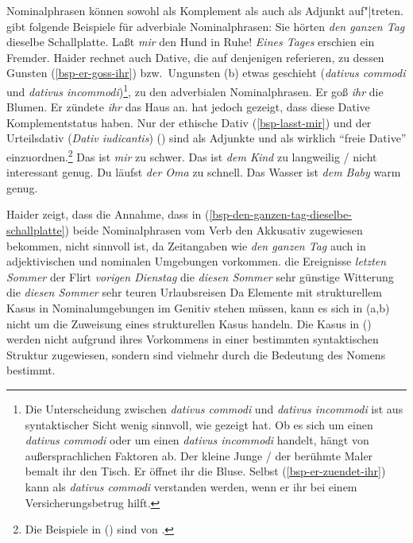 Nominalphrasen können sowohl als Komplement als auch als Adjunkt
auf"|treten. \citet*{Haider85b} gibt folgende 
Beispiele für adverbiale Nominalphrasen:
\eal
\ex Sie hörten \emph{den ganzen Tag} dieselbe Schallplatte.\label{bsp-den-ganzen-tag-dieselbe-schallplatte}
\ex Laßt \emph{mir} den Hund in Ruhe!\label{bsp-lasst-mir}
\ex \emph{Eines Tages} erschien ein Fremder.
\zl
Haider rechnet auch Dative, die auf denjenigen referieren, zu dessen Gunsten (\ref{bsp-er-goss-ihr})
bzw.\ Ungunsten (b) etwas geschieht (\emph{dativus commodi} und \emph{dativus incommodi})\footnote{\label{fn-dativ-commodi}%
        Die Unterscheidung zwischen \emph{dativus commodi} und \emph{dativus incommodi}
        ist aus syntaktischer Sicht wenig sinnvoll, wie \citet*[]{Wegener85b}
        gezeigt hat.
        Ob es sich um einen \emph{dativus commodi} oder um einen \emph{dativus incommodi} handelt,
        hängt von außersprachlichen Faktoren ab.
        \eal
        \ex Der kleine Junge / der berühmte Maler bemalt ihr den Tisch.
        \ex Er öffnet ihr die Bluse.
        \zl
        Selbst (\ref{bsp-er-zuendet-ihr}) kann als \emph{dativus commodi} verstanden werden, wenn
        er ihr bei einem Versicherungsbetrug hilft.%
}, zu den adverbialen Nominalphrasen.
\eal
\ex Er goß \emph{ihr} die Blumen.\label{bsp-er-goss-ihr}
\ex Er zündete \emph{ihr} das Haus an.\label{bsp-er-zuendet-ihr}
\zl
\citet*{Wegener85b} hat jedoch gezeigt, dass diese Dative Komplementstatus haben.
Nur der ethische Dativ (\ref{bsp-lasst-mir}) und der Urteilsdativ (\emph{Dativ iudicantis}) ()
sind als Adjunkte und als wirklich "`freie Dative"' einzuordnen.\footnote{
        Die Beispiele in () sind von \citet*[]{Wegener85b}.
}
\eal
\ex Das ist \emph{mir} zu schwer.
\ex Das ist \emph{dem Kind} zu langweilig / nicht interessant genug.
\ex Du läufst \emph{der Oma} zu schnell.
\ex Das Wasser ist \emph{dem Baby} warm genug.
\zl

\noindent
Haider zeigt, dass die Annahme, dass in (\ref{bsp-den-ganzen-tag-dieselbe-schallplatte}) beide
Nominalphrasen vom Verb den Akkusativ zugewiesen bekommen,
nicht sinnvoll ist, da Zeitangaben wie \emph{den ganzen Tag} auch in adjektivischen und
nominalen Umgebungen vorkommen.
\eal
\ex die Ereignisse \emph{letzten Sommer}
\ex der Flirt \emph{vorigen Dienstag}
\ex die \emph{diesen Sommer} sehr günstige Witterung
\ex die \emph{diesen Sommer} sehr teuren Urlaubsreisen
\zl
Da Elemente mit strukturellem Kasus in Nominalumgebungen
im Genitiv stehen müssen, kann es sich in (a,b)
nicht um die Zuweisung eines strukturellen Kasus handeln.
%
Die Kasus in () werden nicht aufgrund ihres Vorkommens in einer bestimmten
syntaktischen Struktur zugewiesen, sondern sind vielmehr durch die Bedeutung des Nomens bestimmt.

